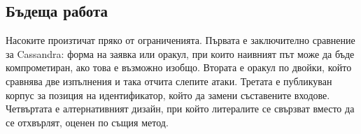 \subsection*{Бъдеща работа}

Насоките произтичат пряко от ограниченията. Първата е заключително сравнение за
Cassandra: форма на заявка или оракул, при които наивният път може да бъде
компрометиран, ако това е възможно изобщо. Втората е оракул по двойки, който
сравнява две изпълнения и така отчита слепите атаки. Третата е публикуван корпус за
позиция на идентификатор, който да замени съставените входове. Четвъртата е
алтернативният дизайн, при който литералите се свързват вместо да се отхвърлят,
оценен по същия метод.
